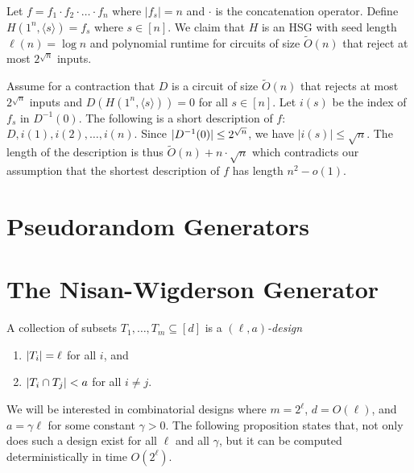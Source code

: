 \begin{proofsk}
    Let $f = f_1 \cdot f_2 \cdot \ldots \cdot f_n$ where $|f_s| = n$ and $\cdot$ is the 
    concatenation operator.
    Define $H(1^n, \langle s \rangle) = f_s$ where $s \in [n]$.
    We claim that $H$ is an HSG with seed length $\ell(n) = \log{n}$ and polynomial 
    runtime for circuits of size $\widetilde{O}(n)$ that reject at most $2^{\sqrt{n}}$ 
    inputs.

    Assume for a contraction that $D$ is a circuit of size $\widetilde{O}(n)$ that 
    rejects at most $2^{\sqrt{n}}$ inputs and $D(H(1^n, \langle s \rangle)) = 0$ for 
    all $s \in [n]$.
    Let $i(s)$ be the index of $f_s$ in $D^{-1}(0)$.
    The following is a short description of $f$: $D, i(1), i(2), \dots, i(n)$.
    Since $\lvert D^{-1}(0)\rvert \leq 2^{\sqrt{n}}$, we have $|i(s)| \leq \sqrt{n}$.
    The length of the description is thus $\widetilde{O}(n) + n \cdot \sqrt{n}$ which 
    contradicts our assumption that the shortest description of $f$ has length $n^2 - 
    o(1)$.

\end{proofsk}

\section{Pseudorandom Generators}

\section{The Nisan-Wigderson Generator}

\begin{definition}\label{def:design}
  A collection of subsets $T_1, \dots, T_m \subseteq [d]$ is a \emph{$(\ell, a)$-design}
	\begin{enumerate}
    \item $\lvert T_i\rvert = \ell$ for all $i$, and
		\item $\lvert T_i \cap T_j\rvert < a$ for all $i \ne j$.
	\end{enumerate}
\end{definition}

We will be interested in combinatorial designs where $m = 2^\ell$, $d =
O(\ell)$, and $a = \gamma \ell$ for some constant $\gamma > 0$. The following
proposition states that, not only does such a design exist for all $\ell$ and
all $\gamma$, but it can be computed deterministically in time $O(2^\ell)$.

